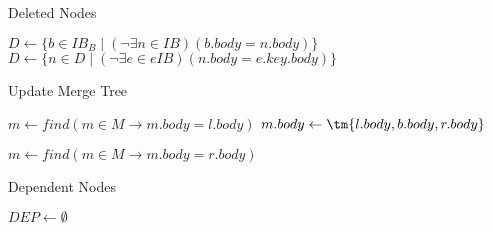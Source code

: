 \documentclass[../../Algorithms.tex]{subfiles}
\begin{document}
    \begin{algorithm}[H]
        \caption{Deleted Nodes}


        \BlankLine
        $D \leftarrow \{b \in IB_B \mid (\lnot \exists n \in IB)(b.body = n.body)\}$\;
        $D \leftarrow \{n \in D \mid (\lnot \exists e \in eIB)(n.body = e.key.body)\}$\;
        \;
    \end{algorithm}

    \begin{algorithm}[H]
        \caption{Update Merge Tree}


        \BlankLine
        $m \leftarrow find(m \in M \rightarrow m.body = l.body)$\;
        $m.body \leftarrow \tm{l.body, b.body, r.body}$\;

        \BlankLine
        $m \leftarrow find(m \in M \rightarrow m.body = r.body)$\;
        \;
    \end{algorithm}

    \begin{algorithm}[H]
        \caption{Dependent Nodes}


        \BlankLine
        $DEP \leftarrow \emptyset$\;

        \BlankLine
        \;
    \end{algorithm}
\end{document}
